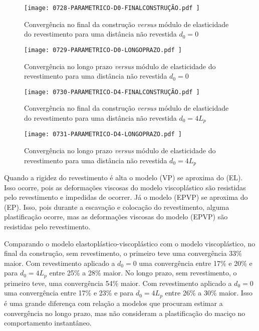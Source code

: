 \begin{figure}[H]
	\begin{center}
		\texttt{[image: 0728-PARAMETRICO-D0-FINALCONSTRUÇÃO.pdf
		]}
	\end{center}
	\caption{\label{PARAMETRICO-D0-FINALCONSTRUÇÃO}Convergência no final da construção \textit{versus} módulo de elasticidade do revestimento para uma distância não revestida $d_0=0$}
\end{figure}

\begin{figure}[H]
	\begin{center}
		\texttt{[image: 0729-PARAMETRICO-D0-LONGOPRAZO.pdf
		]}
	\end{center}
	\caption{\label{PARAMETRICO-D0-LONGOPRAZO}Convergência no longo prazo \textit{versus} módulo de elasticidade do revestimento para uma distância não revestida $d_0=0$}
\end{figure}

\begin{figure}[H]
	\begin{center}
		\texttt{[image: 0730-PARAMETRICO-D4-FINALCONSTRUÇÃO.pdf
		]}
	\end{center}
	\caption{\label{PARAMETRICO-D4-FINALCONSTRUÇÃO}Convergência no final da construção \textit{versus} módulo de elasticidade do revestimento para uma distância não revestida $d_0=4L_p$}
\end{figure}

\begin{figure}[H]
	\begin{center}
		\texttt{[image: 0731-PARAMETRICO-D4-LONGOPRAZO.pdf
		]}
	\end{center}
	\caption{\label{PARAMETRICO-D4-LONGOPRAZO}Convergência no longo prazo \textit{versus} módulo de elasticidade do revestimento para uma distância não revestida $d_0=4L_p$}
\end{figure}

Quando a rigidez do revestimento é alta o modelo (VP) se aproxima do (EL). Isso ocorre, pois as deformações viscosas do modelo viscoplástico são resistidas pelo revestimento e impedidas de ocorrer. Já o modelo (EPVP) se aproxima do (EP). Isso, pois durante a escavação e colocação do revestimento, alguma plastificação ocorre, mas as deformações viscosas do modelo (EPVP) são resistidas pelo revestimento.

Comparando o modelo elastoplástico-viscoplástico com o modelo viscoplástico, no final da construção, sem revestimento, o primeiro teve uma convergência 33\% maior. Com revestimento aplicado a $d_0=0$ uma convergência entre 17\% e 20\% e para $d_0=4L_p$ entre 25\% a 28\% maior. No longo prazo, sem revestimento, o primeiro teve, uma convergência 54\% maior. Com revestimento aplicado a $d_0=0$ uma convergência entre 17\% e 23\% e para $d_0=4L_p$ entre 26\% a 30\% maior. Isso é uma grande diferença com relação a modelos que procuram estimar a convergência no longo prazo, mas não consideram a plastificação do maciço no comportamento instantâneo.

